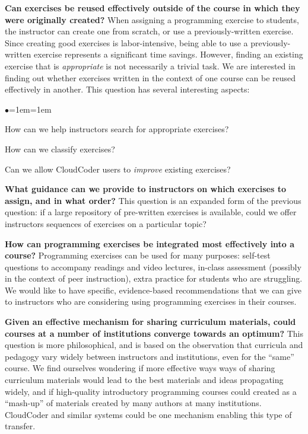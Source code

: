 \documentclass{sig-alternate}
\newenvironment{denseItemize}{%
\begin{list}{$\bullet$}{\setlength{\itemsep}{0in}\setlength{\parsep}{0in}\leftmargin=1em\labelwidth=1em}}{\end{list}}
\begin{document}
{\bf Can exercises be reused effectively outside of the course in which
they were originally created?}  When assigning a programming exercise to
students, the instructor can create one from scratch, or use a
previously-written exercise.  Since creating good exercises is labor-intensive,
being able to use a previously-written exercise represents a significant
time savings.  However, finding an existing exercise that is {\em appropriate}
is not necessarily a trivial task.  We are interested in finding
out whether exercises written in the context of one course can be reused
effectively in another.
This question has several interesting aspects:

\begin{denseItemize}
\item How can we help instructors search for appropriate exercises?
\item How can we classify exercises?
\item Can we allow CloudCoder users to {\em improve} existing exercises?
\end{denseItemize}

{\bf What guidance can we provide to instructors on which exercises to assign,
and in what order?}  This question is an expanded form of the previous question:
if a large repository of pre-written exercises is available,
could we offer instructors sequences of exercises on a particular topic?

{\bf How can programming exercises be integrated most effectively into a course?}
Programming exercises can be used for many purposes: self-test questions
to accompany readings and video lectures, in-class assessment (possibly
in the context of peer instruction), extra practice for students who
are struggling.  We would like to have specific, evidence-based recommendations
that we can give to instructors who are considering using programming
exercises in their courses.

{\bf Given an effective mechanism for sharing curriculum materials, could
courses at a number of institutions converge towards an optimum?}
This question is more philosophical, and is based on the observation that
curricula and pedagogy vary widely between instructors and institutions,
even for the ``same'' course\cite{Hertz:2010:CCM:1734263.1734335}.  We find ourselves wondering
if more effective ways ways of sharing curriculum materials would lead
to the best materials and ideas propagating widely, and if high-quality introductory
programming courses could created as a ``mash-up'' of materials created by
many authors at many institutions.  CloudCoder and similar systems
could be one mechanism enabling this type of transfer.
\end{document}

